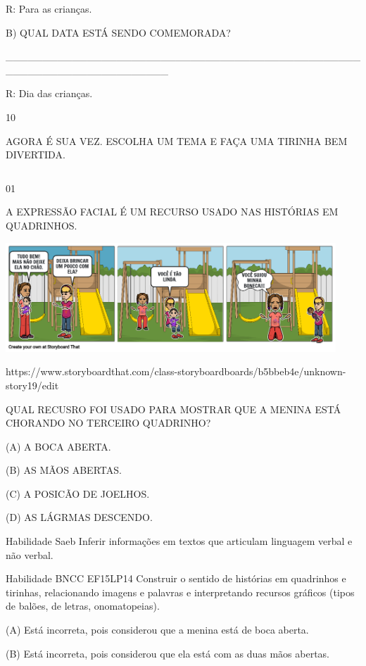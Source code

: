 {{R: Para as crianças.

B) QUAL DATA ESTÁ SENDO COMEMORADA?

\_\_\_\_\_\_\_\_\_\_\_\_\_\_\_\_\_\_\_\_\_\_\_\_\_\_\_\_\_\_\_\_\_\_\_\_\_\_\_\_\_\_\_\_\_\_\_\_\_\_\_\_\_\_\_\_\_\_\_\_\_\_\_\_\_\_\_\_\_\_

R: Dia das crianças.

\num{10}

AGORA É SUA VEZ. ESCOLHA UM TEMA E FAÇA UMA TIRINHA BEM DIVERTIDA.

\begin{longtable}[]{@{}ll@{}}
\toprule
&\tabularnewline
\bottomrule
\end{longtable}


\num{01}

A EXPRESSÃO FACIAL É UM RECURSO USADO NAS HISTÓRIAS EM QUADRINHOS.

\includegraphics[width=4.88436in,height=1.61667in]{media/image136.png}

https://www.storyboardthat.com/class-storyboardboards/b5bbeb4e/unknown-story19/edit

QUAL RECUSRO FOI USADO PARA MOSTRAR QUE A MENINA ESTÁ CHORANDO NO
TERCEIRO QUADRINHO?

(A) A BOCA ABERTA.

(B) AS MÃOS ABERTAS.

(C) A POSICÃO DE JOELHOS.

(D) AS LÁGRMAS DESCENDO.

\protect\hypertarget{_Hlk129246313}{}{}Habilidade Saeb Inferir
informações em textos que articulam linguagem verbal e não verbal.

Habilidade BNCC EF15LP14 Construir o sentido de histórias em quadrinhos
e tirinhas, relacionando imagens e palavras e interpretando recursos
gráficos (tipos de balões, de letras, onomatopeias).

(A) Está incorreta, pois considerou que a menina está de boca aberta.

(B) Está incorreta, pois considerou que ela está com as duas mãos
abertas.

}}
